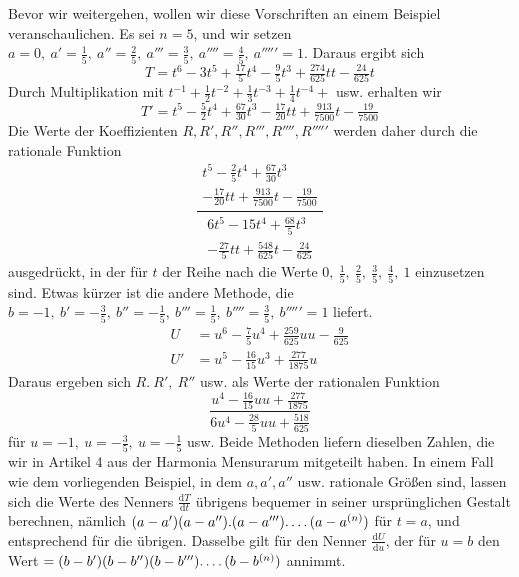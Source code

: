 Bevor wir weitergehen, wollen wir diese Vorschriften an einem Beispiel veranschaulichen. Es sei $n=5$, und wir setzen $a=0,\ a'=\frac15,\ a''=\frac25,\ a'''=\frac35,\ a''''=\frac45,\ a'''''=1$. Daraus ergibt sich
\[
T=t^6-3t^5+\tfrac{17}{5}t^4-\tfrac95t^3+\tfrac{274}{625}tt-\tfrac{24}{625}t
\]
Durch Multiplikation mit $t^{-1}+\frac12t^{-2}+\frac13t^{-3}+\frac14t^{-4}+$ usw. erhalten wir
\[
T'=t^5-\tfrac52t^4+\tfrac{67}{30}t^3-\tfrac{17}{20}tt+\tfrac{913}{7500}t-\tfrac{19}{7500}
\]
Die Werte der Koeffizienten $R, R', R'', R''', R'''', R'''''$ werden daher durch die rationale Funktion
\[
\frac{\begin{gathered}t^5-\frac25t^4+\frac{67}{30}t^3\\-\frac{17}{20}tt+\frac{913}{7500}t-\frac{19}{7500}\end{gathered}}
{\begin{gathered}6t^5-15t^4+\frac{68}{5}t^3\\-\frac{27}{5}tt+\frac{548}{625}t-\frac{24}{625}\end{gathered}}
\]
ausgedrückt, in der für $t$ der Reihe nach die Werte $0,\ \frac15,\ \frac25,\ \frac35,\ \frac45,\ 1$ einzusetzen sind. Etwas kürzer ist die andere Methode, die $b=-1,\ b'=-\frac35,\ b''=-\frac15,\ b'''=\frac15,\ b''''=\frac35,\ b'''''=1$ liefert.
\[
\begin{aligned}
U&=u^6-\tfrac75u^4+\tfrac{259}{625}uu-\tfrac9{625}\\
U'&=u^5-\tfrac{16}{15}u^3+\tfrac{277}{1875}u
\end{aligned}
\]
Daraus ergeben sich $R.\ R',\ R''$ usw. als Werte der rationalen Funktion
\[
\frac{u^4-\frac{16}{15}uu+\frac{277}{1875}}
{6u^4-\frac{28}{5}uu+\frac{518}{625}}
\]
für $u=-1,\ u=-\frac35,\ u=-\frac15$ usw. Beide Methoden liefern dieselben Zahlen, die wir in Artikel 4 aus der Harmonia Mensurarum mitgeteilt haben. In einem Fall wie dem vorliegenden Beispiel, in dem $a, a', a''$ usw. rationale Größen sind, lassen sich die Werte des Nenners $\frac{\mathrm{d}T}{\mathrm{d}t}$ übrigens bequemer in seiner ursprünglichen Gestalt berechnen, nämlich $(a-a')(a-a'').(a-a''')\ldotp\ldotp\ldotp\ldotp(a-a^{(n)})$ für $t=a$, und entsprechend für die übrigen. Dasselbe gilt für den Nenner $\frac{\mathrm{d}U}{\mathrm{d}u}$, der für $u=b$ den Wert $=(b-b')(b-b'')(b-b''')\ldotp\ldotp\ldotp\ldotp(b-b^{(n)})$ annimmt.
